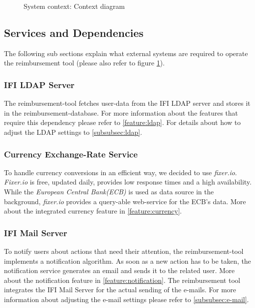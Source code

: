 \begin{figure}[H]
	\centering
	\caption{System context: Context diagram}
	\label{fig:context-diagram}
\end{figure}

\subsection{Services and Dependencies}
The following sub sections explain what external systems are required to operate the reimbursement tool (please also refer to figure \ref{fig:context-diagram}).

\subsubsection{IFI LDAP Server}
The reimbursement-tool fetches user-data from the IFI LDAP server  and stores it in the reimbursement-database.  For more information about the features that require this dependency please refer to \ref{feature:ldap}. For details about how to adjust the LDAP settings to \ref{subsubsec:ldap}.

\subsubsection{Currency Exchange-Rate Service}
To handle currency conversions in an efficient way, we decided to use \textit{fixer.io}\cite{fixer}. \textit{Fixer.io} is free, updated daily, provides low response times and a high availability. While the \textit{European Central Bank(ECB)}\cite{ecb} is used as data source in the background, \textit{fixer.io} provides a query-able web-service for the ECB's data. More about the integrated currency feature in \ref{feature:currency}.

\subsubsection{IFI Mail Server}
\label{dep:email}
To notify users about actions that need their attention, the reimbursement-tool implements a notification algorithm. As soon as a new action has to be taken, the notification service generates an email and sends it to the related user. More about the notification feature in \ref{feature:notification}. The reimbursement tool integrates the IFI Mail Server for the actual sending of the e-mails. For more information about adjusting the e-mail settings please refer to \ref{subsubsec:e-mail}.



